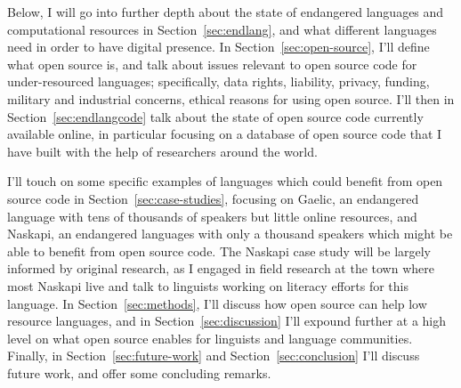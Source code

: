 Below, I will go into further depth about the state of endangered languages and computational resources in Section~\ref{sec:endlang}, and what different languages need in order to have digital presence. In Section~\ref{sec:open-source}, I'll define what open source is, and talk about issues relevant to open source code for under-resourced languages; specifically, data rights, liability, privacy, funding, military and industrial concerns, ethical reasons for using open source. I'll then in Section~\ref{sec:endlangcode} talk about the state of open source code currently available online, in particular focusing on a database of open source code that I have built with the help of researchers around the world.

I'll touch on some specific examples of languages which could benefit from open source code in Section~\ref{sec:case-studies}, focusing on Gaelic, an endangered language with tens of thousands of speakers but little online resources, and Naskapi, an endangered languages with only a thousand speakers which might be able to benefit from open source code. The Naskapi case study will be largely informed by original research, as I engaged in field research at the town where most Naskapi live and talk to linguists working on literacy efforts for this language. In Section~\ref{sec:methods}, I'll discuss how open source can help low resource languages, and in Section~\ref{sec:discussion} I'll expound further at a high level on what open source enables for linguists and language communities. Finally, in Section~\ref{sec:future-work} and Section~\ref{sec:conclusion} I'll discuss future work, and offer some concluding remarks.
